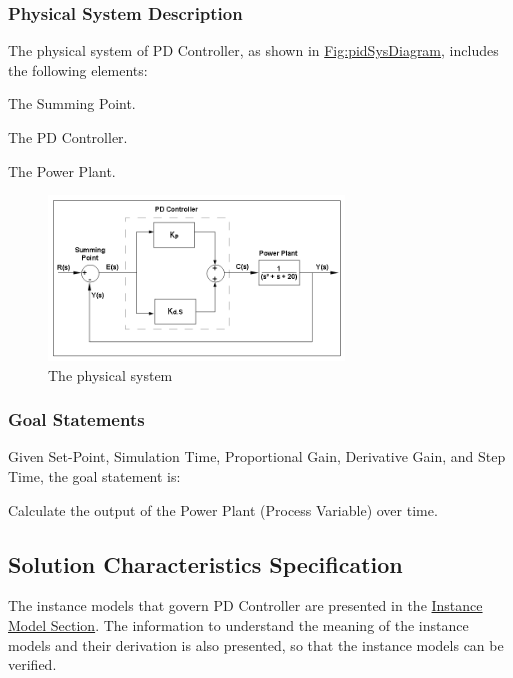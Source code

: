 \documentclass[12pt]{article}
\begin{document}
\subsubsection{Physical System Description}
\label{Sec:PhysSyst}
The physical system of PD Controller, as shown in \hyperref[Figure:pidSysDiagram]{Fig:pidSysDiagram}, includes the following elements:

\begin{description}[font=\normalfont]
\item[PS1:]{The Summing Point.}
\item[PS2:]{The PD Controller.}
\item[PS3:]{The Power Plant.}
\end{description}
\begin{figure}[H]
\begin{center}
\includegraphics[width=0.7\textwidth]{../../../../datafiles/pdcontroller/Fig_PDController.png}
\caption{The physical system}
\label{Figure:pidSysDiagram}
\end{center}
\end{figure}
\subsubsection{Goal Statements}
\label{Sec:GoalStmt}
Given Set-Point, Simulation Time, Proportional Gain, Derivative Gain, and Step Time, the goal statement is:

\begin{description}[font=\normalfont]
\item[Process-Variable:\phantomsection\label{calculateProcessVariable}]{Calculate the output of the Power Plant (Process Variable) over time.}
\end{description}
\subsection{Solution Characteristics Specification}
\label{Sec:SolCharSpec}
The instance models that govern PD Controller are presented in the \hyperref[Sec:IMs]{Instance Model Section}. The information to understand the meaning of the instance models and their derivation is also presented, so that the instance models can be verified.
\end{document}
